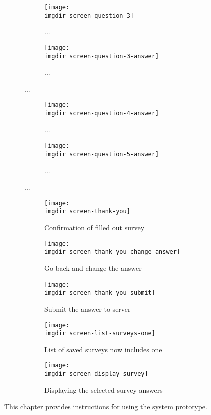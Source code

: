 \begin{figure}
 \centering
 \begin{subfigure}{.3\textwidth}
  \centering
  \texttt{[image: \\imgdir screen-question-3]}
  \caption{...}
  \label{fig:sfig1}
\end{subfigure}
\begin{subfigure}{.3\textwidth}
  \centering
  \texttt{[image: \\imgdir screen-question-3-answer]}
  \caption{...}
  \label{fig:sfig2}
\end{subfigure}
 \caption{...}
\end{figure}

\begin{figure}
 \centering
 \begin{subfigure}{.3\textwidth}
  \centering
  \texttt{[image: \\imgdir screen-question-4-answer]}
  \caption{...}
  \label{fig:sfig1}
\end{subfigure}
\begin{subfigure}{.3\textwidth}
  \centering
  \texttt{[image: \\imgdir screen-question-5-answer]}
  \caption{...}
  \label{fig:sfig2}
\end{subfigure}
 \caption{...}
\end{figure}

\begin{figure}
 \centering
 \begin{subfigure}{.3\textwidth}
  \centering
  \texttt{[image: \\imgdir screen-thank-you]}
  \caption{Confirmation of filled out survey}
  \label{fig:sfig1}
\end{subfigure}
\begin{subfigure}{.3\textwidth}
  \centering
  \texttt{[image: \\imgdir screen-thank-you-change-answer]}
  \caption{Go back and change the answer}
  \label{fig:sfig2}
\end{subfigure}
\begin{subfigure}{.3\textwidth}
  \centering
  \texttt{[image: \\imgdir screen-thank-you-submit]}
  \caption{Submit the answer to server}
  \label{fig:sfig2}
\end{subfigure}
\caption{...}
 \caption{}
\end{figure}

\begin{figure}
 \centering
 \begin{subfigure}{.3\textwidth}
  \centering
  \texttt{[image: \\imgdir screen-list-surveys-one]}
  \caption{List of saved surveys now includes one}
  \label{fig:sfig1}
\end{subfigure}
\begin{subfigure}{.3\textwidth}
  \centering
  \texttt{[image: \\imgdir screen-display-survey]}
  \caption{Displaying the selected survey answers}
  \label{fig:sfig2}
\end{subfigure}
\caption{...}
 \caption{}
\end{figure}
This chapter provides instructions for using the system prototype.

